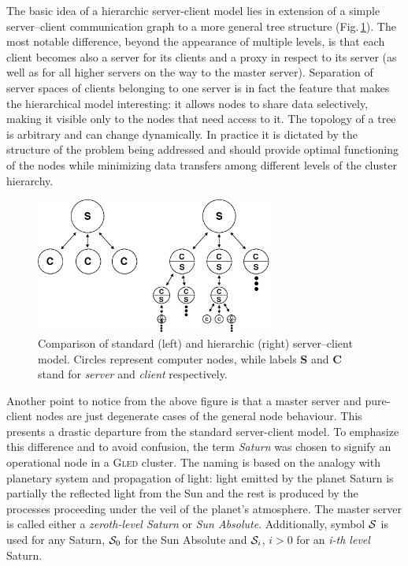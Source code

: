 \documentclass[final]{siamltex}
\def\gled{\textsc{Gled}\xspace}
\begin{document}
The basic idea of a hierarchic server-client model lies in extension
of a simple server--client communication graph to a more general tree
structure (Fig.\,\ref{fig:hscm}). The most notable difference, beyond
the appearance of multiple levels, is that each client becomes also a
server for its clients and a proxy in respect to its server (as well
as for all higher servers on the way to the master server). Separation
of server spaces of clients belonging to one server is in fact the
feature that makes the hierarchical model interesting: it allows nodes
to share data selectively, making it visible only to the nodes that
need access to it. The topology of a tree is arbitrary and can change
dynamically. In practice it is dictated by the structure of the
problem being addressed and should provide optimal functioning of the
nodes while minimizing data transfers among different levels of the
cluster hierarchy.

\begin{figure}
\centering
\includegraphics[height=4.45cm]{figs/hscm.eps}
\caption{Comparison of standard (left) and hierarchic (right)
  server--client model. Circles represent computer nodes, while
  labels \textbf{S} and \textbf{C} stand for \emph{server} and
  \emph{client} respectively.}
\label{fig:hscm}
\end{figure}

Another point to notice from the above figure is that a master server
and pure-client nodes are just degenerate cases of the general node
behaviour. This presents a drastic departure from the standard
server-client model. To emphasize this difference and to avoid
confusion, the term \emph{Saturn} was chosen to signify an operational
node in a \gled cluster. The naming is based on the analogy with
planetary system and propagation of light: light emitted by the planet
Saturn is partially the reflected light from the Sun and the rest is
produced by the processes proceeding under the veil of the planet's
atmosphere. The master server is called either a \emph{zeroth-level
 Saturn} or \emph{Sun Absolute}. Additionally, symbol ${\cal S}$ is
used for any Saturn, ${\cal S}_0$ for the Sun Absolute and ${\cal
 S}_i$, $i > 0$ for an \emph{i-th level} Saturn.
\end{document}
